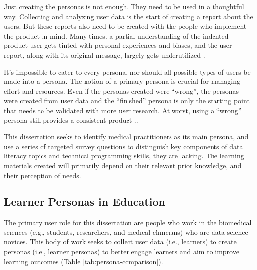 \documentclass[010-intro.tex]{subfiles}
\begin{document}
        Just creating the personas is not enough.
        They need to be used in a thoughtful way.
        Collecting and analyzing user data is the start of creating a report about the users.
        But these reports also need to be created with the people who implement the product in mind.
        Many times, a partial understanding of the indented product user gets
        tinted with personal experiences and biases,
        and the user report, along with its original message, largely gets underutilized
        \cite{pruittPersonaLifecycleKeeping2006}.

        It's impossible to cater to every persona,
        nor should all possible types of users be made into a persona.
        The notion of a primary persona is crucial for managing effort and resources.
        Even if the personas created were ``wrong'',
        the personas were created from user data and the ``finished'' persona is only the starting point
        that needs to be validated with more user research.
        At worst, using a ``wrong'' persona still provides a consistent product
        \cite{pruittPersonaLifecycleKeeping2006}..

        This dissertation seeks to identify medical practitioners as its main persona,
        and use a series of targeted survey questions to distinguish key components
        of data literacy topics and technical programming skills, they are lacking.
        The learning materials created will primarily depend on their relevant prior knowledge,
        and their perception of needs.

\subsection{Learner Personas in Education}
\label{sse:intro-learner-personas}

    The primary user role for this dissertation are people who work in the biomedical sciences
    (e.g., students, researchers, and medical clinicians)
    who are data science novices.
    This body of work seeks to collect user data (i.e., learners) to create personas (i.e., learner personas)
    to better engage learners and aim to improve learning outcomes (Table \ref{tab:persona-comparison}).
\end{document}

